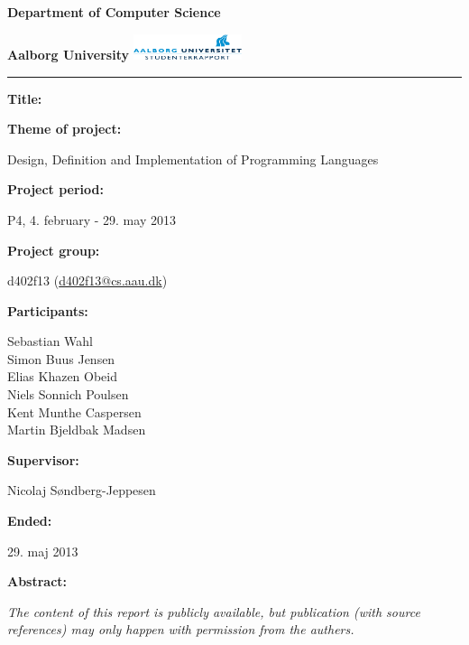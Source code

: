 \begin{nopagebreak}
\LARGE{\textbf{Department of Computer Science}}\vspace{-0.6cm}

\large{\textbf{Aalborg University}}
\hspace{5.70cm}\includegraphics[height=0.75cm]{pictures/aau_logo.pdf}


\hrule

\newcommand{\titleitem}[2]{\textbf{#1:}

\hspace*{0.5cm}
\begin{minipage}{0.9\columnwidth}#2\end{minipage}
\vspace{0.25cm}}
\begin{multicols}{2}

\titleitem{Title}{}

\titleitem{Theme of project}{Design, Definition and Implementation of Programming Languages}

\titleitem{Project period}{P4, 4. february - 29. may 2013}

\titleitem{Project group}{d402f13 (\url{d402f13@cs.aau.dk})}

\titleitem{Participants}{
    Sebastian Wahl\\
    Simon Buus Jensen\\
    Elias Khazen Obeid\\
    Niels Sonnich Poulsen\\
    Kent Munthe Caspersen\\
    Martin Bjeldbak Madsen
}

\titleitem{Supervisor}{Nicolaj Søndberg-Jeppesen}

\titleitem{Ended}{29. maj 2013}

\vfill
\columnbreak

\titleitem{Abstract}{}

\end{multicols}
\centering
\textit{The content of this report is publicly available, but publication (with source references) may only happen with permission from the authers.}

\end{nopagebreak}
